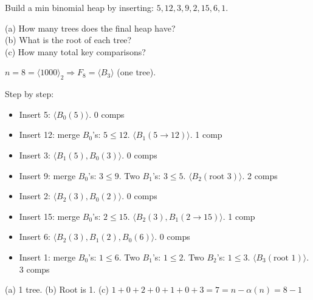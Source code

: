 \documentclass[11pt]{article}
\begin{document}
\begin{examplebox}
Build a min binomial heap by inserting: $5, 12, 3, 9, 2, 15, 6, 1$.

(a) How many trees does the final heap have?\\
(b) What is the root of each tree?\\
(c) How many total key comparisons?

\begin{answerband}
$n = 8 = \langle 1000 \rangle_2 \Rightarrow F_8 = \langle B_3 \rangle$ (one tree).

Step by step:
\begin{itemize}[leftmargin=1.4em,itemsep=1pt]
  \item Insert 5: $\langle B_0(5) \rangle$. \hfill 0 comps
  \item Insert 12: merge $B_0$'s: $5 \le 12$. $\langle B_1(5 \to 12) \rangle$. \hfill 1 comp
  \item Insert 3: $\langle B_1(5), B_0(3) \rangle$. \hfill 0 comps
  \item Insert 9: merge $B_0$'s: $3 \le 9$. Two $B_1$'s: $3 \le 5$. $\langle B_2(\text{root } 3) \rangle$. \hfill 2 comps
  \item Insert 2: $\langle B_2(3), B_0(2) \rangle$. \hfill 0 comps
  \item Insert 15: merge $B_0$'s: $2 \le 15$. $\langle B_2(3), B_1(2 \to 15) \rangle$. \hfill 1 comp
  \item Insert 6: $\langle B_2(3), B_1(2), B_0(6) \rangle$. \hfill 0 comps
  \item Insert 1: merge $B_0$'s: $1 \le 6$. Two $B_1$'s: $1 \le 2$. Two $B_2$'s: $1 \le 3$. $\langle B_3(\text{root } 1) \rangle$. \hfill 3 comps
\end{itemize}

(a) \textcolor{violetT}{1 tree.} \quad (b) \textcolor{violetT}{Root is 1.} \quad (c) \textcolor{violetT}{$1+0+2+0+1+0+3 = 7 = n - \alpha(n) = 8 - 1$}
\end{answerband}
\end{examplebox}
\end{document}

